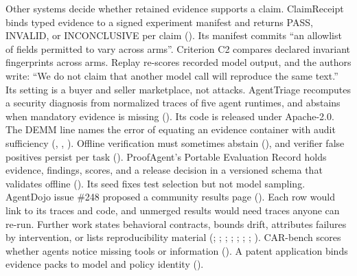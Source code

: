 \documentclass[
  american,
  10pt,
  a4paper,
]{article}
\begin{document}
Other systems decide whether retained evidence supports a claim.
ClaimReceipt binds typed evidence to a signed experiment manifest and
returns PASS, INVALID, or INCONCLUSIVE per claim
(). Its manifest
commits ``an allowlist of fields permitted to vary across arms''.
Criterion C2 compares declared invariant fingerprints across arms.
Replay re-scores recorded model output, and the authors write: ``We do
not claim that another model call will reproduce the same text.'' Its
setting is a buyer and seller marketplace, not attacks. AgentTriage
recomputes a security diagnosis from normalized traces of five agent
runtimes, and abstains when mandatory evidence is missing
(). Its code is
released under Apache-2.0. The DEMM line names the error of equating an
evidence container with audit sufficiency
(,
,
). Offline verification
must sometimes abstain (), and verifier false positives persist per task
(). ProofAgent's Portable
Evaluation Record holds evidence, findings, scores, and a release
decision in a versioned schema that validates offline
(). Its seed fixes
test selection but not model sampling. AgentDojo issue \#248 proposed a
community results page (). Each row would link to its traces and code, and unmerged results
would need traces anyone can re-run. Further work states behavioral
contracts, bounds drift, attributes failures by intervention, or lists
reproducibility material (; ;
;
;
;
;
;
). CAR-bench scores
whether agents notice missing tools or information
(). A patent
application binds evidence packs to model and policy identity
().
\end{document}
